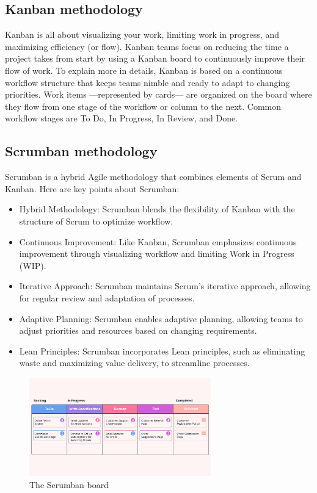 \subsection{Kanban methodology}
Kanban is all about visualizing your work, limiting work in progress, and maximizing efficiency (or flow).
Kanban teams focus on reducing the time a project takes from start by using a Kanban board to continuously improve their flow of work.
To explain more in details, Kanban is based on a continuous workflow structure that keeps teams nimble and ready to adapt to changing priorities.
Work items —represented by cards— are organized on the board where they flow from one stage of the workflow or column to the next.
Common workflow stages are To Do, In Progress, In Review, and Done.

\subsection{Scrumban methodology}
Scrumban is a hybrid Agile methodology that combines elements of Scrum and Kanban. Here are key points about Scrumban:

\begin{itemize}
    \item Hybrid Methodology: Scrumban blends the flexibility of Kanban with the structure of Scrum to optimize workflow.
    \item Continuous Improvement: Like Kanban, Scrumban emphasizes continuous improvement through visualizing workflow and limiting Work in Progress (WIP).
    \item Iterative Approach: Scrumban maintains Scrum's iterative approach, allowing for regular review and adaptation of processes.
    \item Adaptive Planning: Scrumban enables adaptive planning, allowing teams to adjust priorities and resources based on changing requirements.
    \item Lean Principles: Scrumban incorporates Lean principles, such as eliminating waste and maximizing value delivery, to streamline processes.
\end{itemize}

\begin{figure}[H]
    \centering
    \includegraphics[width=0.7\textwidth]{src/assets/chapters/Scrumban.png}
    \caption{The Scrumban board}
    \label{fig:Scrumban_image}
\end{figure}


